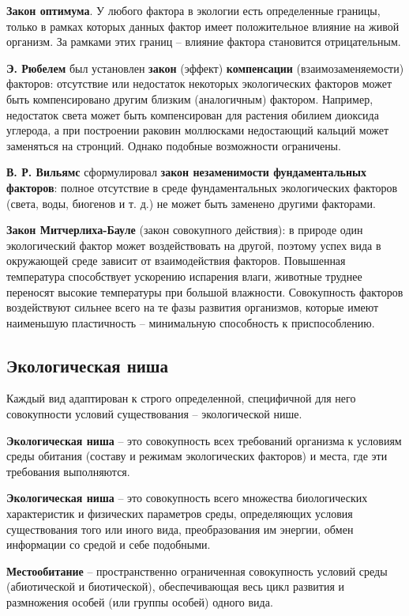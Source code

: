 \documentclass[a5paper, 11pt]{extarticle}
\theoremstyle{definition}
\theoremstyle{definition}
\theoremstyle{definition}
\numberwithin{figure}{section}
\begin{document}
\textbf{Закон оптимума}. У любого фактора в экологии есть определенные границы, только в рамках которых данных фактор имеет положительное влияние на живой организм. За рамками этих границ -- влияние фактора становится отрицательным.

\textbf{Э. Рюбелем} был установлен \textbf{закон} (эффект) \textbf{компенсации} (взаимозаменяемости) факторов: отсутствие или недостаток некоторых экологических факторов может быть компенсировано другим близким (аналогичным) фактором. Например, недостаток света может быть компенсирован для растения обилием диоксида углерода, а при построении раковин моллюсками недостающий кальций может заменяться на стронций. Однако подобные возможности ограничены.

\textbf{В. Р. Вильямс} сформулировал \textbf{закон незаменимости фундаментальных факторов}: полное отсутствие в среде фундаментальных экологических факторов (света, воды, биогенов и т. д.) не может быть заменено другими факторами.

\textbf{Закон Митчерлиха-Бауле} (закон совокупного действия): в природе один экологический фактор может воздействовать на другой, поэтому успех вида в окружающей среде зависит от взаимодействия факторов. Повышенная температура способствует ускорению испарения влаги, животные труднее переносят высокие температуры при большой влажности. Совокупность факторов воздействуют сильнее всего на те фазы развития организмов, которые имеют наименьшую пластичность -- минимальную способность к приспособлению.

\subsection{Экологическая ниша}

Каждый вид адаптирован к строго определенной, специфичной для него совокупности условий существования -- экологической нише.

\textbf{Экологическая ниша} -- это совокупность всех требований организма к условиям среды обитания (составу и режимам экологических факторов) и места, где эти требования выполняются.

\textbf{Экологическая ниша} -- это совокупность всего множества биологических характеристик и физических параметров среды, определяющих условия существования того или иного вида, преобразования им энергии, обмен информации со средой и себе подобными.

\textbf{Местообитание} -- пространственно ограниченная совокупность условий среды (абиотической и биотической), обеспечивающая весь цикл развития и размножения особей (или группы особей) одного вида.
\end{document}
